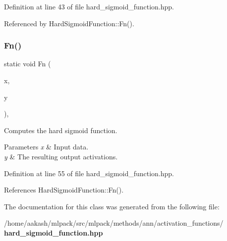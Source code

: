 Definition at line 43 of file hard\+\_\+sigmoid\+\_\+function.\+hpp.



Referenced by Hard\+Sigmoid\+Function\+::\+Fn().

\mbox{\label{classmlpack_1_1ann_1_1HardSigmoidFunction_af6cf5da90eb6312e3e25c9b8bd9c3527}} 
\subsubsection{Fn()\hspace{0.1cm}{\footnotesize\ttfamily [2/2]}}
{\footnotesize\ttfamily static void Fn (\begin{DoxyParamCaption}\item[{const Input\+Vec\+Type \&}]{x,  }\item[{Output\+Vec\+Type \&}]{y }\end{DoxyParamCaption})\hspace{0.3cm}{\ttfamily [inline]}, {\ttfamily [static]}}



Computes the hard sigmoid function. 


\begin{DoxyParams}{Parameters}
{\em x} & Input data. \\
\hline
{\em y} & The resulting output activations. \\
\hline
\end{DoxyParams}


Definition at line 55 of file hard\+\_\+sigmoid\+\_\+function.\+hpp.



References Hard\+Sigmoid\+Function\+::\+Fn().



The documentation for this class was generated from the following file\+:\begin{DoxyCompactItemize}
\item 
/home/aakash/mlpack/src/mlpack/methods/ann/activation\+\_\+functions/\textbf{ hard\+\_\+sigmoid\+\_\+function.\+hpp}\end{DoxyCompactItemize}
